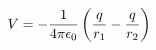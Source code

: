 \documentclass[preview]{standalone}
\begin{document}
\begin{align*}
V  =  -{1 \over 4\pi\epsilon_0}  \left( \frac{q}{r_1} - \frac{q}{r_2} \right)
\end{align*}
\end{document}
